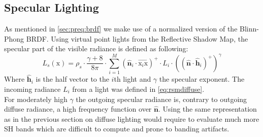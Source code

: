 \documentclass[thesis.tex]{subfiles}
\begin{document}
\subsection{Specular Lighting} \label{sec:impl:specenvmap}
As mentioned in \autoref{sec:preq:brdf} we make use of a normalized version of the Blinn-Phong BRDF.
Using virtual point lights from the Reflective Shadow Map, the specular part of the visible radiance is defined as following:
\begin{equation}
L_s (\mathrm{x}) = \rho_s \cdot \frac{\gamma + 8}{8\pi} \cdot \sum\limits_{i=1}^{M}
(\hat{\mathbf{n}}_i\cdot \overrightarrow{\mathrm{x}_i\mathrm{x}})^+ \cdot L_i \cdot ((\hat{\mathbf{n}} \cdot \hat{\mathbf{h}}_i)^+)^\gamma
\end{equation}
Where $\hat{\mathbf{h}}_i$ is the half vector to the $i$th light and $\gamma$ the specular exponent.
The incoming radiance $L_i$ from a light was defined in \autoref{eq:rsmdiffuse}.
\\
For moderately high $\gamma$ the outgoing specular radiance is, contrary to outgoing diffuse radiance, a high frequency function over $\hat{\mathbf{n}}$.
Using the same representation as in the previous section on diffuse lighting would require to evaluate much more SH bands which are difficult to compute and prone to banding artifacts.
\end{document}
